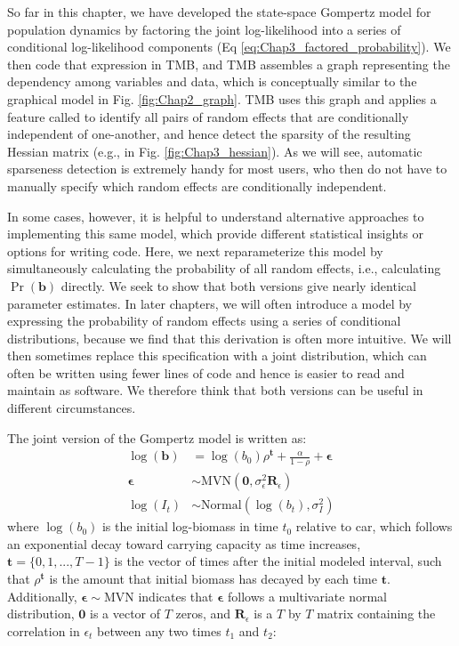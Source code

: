 So far in this chapter, we have developed the state-space Gompertz model for population dynamics by factoring the joint log-likelihood into a series of conditional log-likelihood components (Eq \ref{eq:Chap3_factored_probability}). We then code that expression in TMB, and TMB assembles a graph representing the dependency among variables and data, which is conceptually similar to the graphical model in Fig. \ref{fig:Chap2_graph}.  TMB uses this graph and applies a feature called  to identify all pairs of random effects that are conditionally independent of one-another, and hence detect the sparsity of the resulting Hessian matrix (e.g., in Fig. \ref{fig:Chap3_hessian}).  As we will see, automatic sparseness detection is extremely handy for most users, who then do not have to manually specify which random effects are conditionally independent.

In some cases, however, it is helpful to understand alternative approaches to implementing this same model, which provide different statistical insights or options for writing code.  Here, we next reparameterize this model by simultaneously calculating the probability of all random effects, i.e., calculating \( \Pr(\mathbf{b}) \) directly.  We seek to show that both versions give nearly identical parameter estimates.  In later chapters, we will often introduce a model by expressing the probability of random effects using a series of conditional distributions, because we find that this derivation is often more intuitive.  We will then sometimes replace this specification with a joint distribution, which can often be written using fewer lines of code and hence is easier to read and maintain as software.  We therefore think that both versions can be useful in different circumstances.  

The joint version of the Gompertz model \cite{thorson_importance_2014} is written as:
\begin{equation}
\begin{aligned}
    \log(\mathbf{b}) & = \log(b_0) \rho^{\mathbf{t}} + \frac{\alpha}{1-\rho} + \mathbf{\epsilon} \\
    \mathbf{\epsilon} & \sim \mathrm{MVN} (\mathbf{0}, \sigma_{\epsilon}^2 \mathbf{R}_{\epsilon}) \\
    \log(I_t) & \sim \mathrm{Normal} (\log(b_{t}), \sigma_{I}^2) 
\end{aligned}
\end{equation}
where \(\log(b_0)\) is the initial log-biomass in time \(t_0\) relative to car, which follows an exponential decay toward carrying capacity as time increases, \(\mathbf{t} = \{0,1,...,T-1\}\) is the vector of times after the initial modeled interval, such that \(\rho^{\mathbf{t}}\) is the amount that initial biomass has decayed by each time \(\mathbf{t}\).  Additionally, \( \mathbf{\epsilon} \sim \mathrm{MVN} \) indicates that \( \mathbf{\epsilon}\) follows a multivariate normal distribution, \(\mathbf{0}\) is a vector of \(T\) zeros, and \( \mathbf{R}_{\epsilon} \) is a \(T\) by \(T\) matrix containing the correlation in \(\epsilon_t\) between any two times \(t_1\) and \(t_2\):

